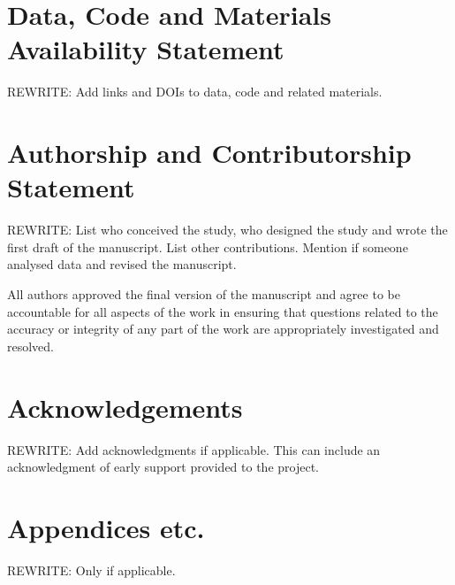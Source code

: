 \documentclass{ldr-article}
\begin{document}
\section{Data, Code and Materials Availability Statement}

\alert{REWRITE:} Add links and DOIs to data, code and related materials.

\section{Authorship and Contributorship Statement}

\alert{REWRITE:} List who conceived the study, who designed the study and wrote the first draft of the manuscript. List other contributions. Mention if someone analysed data and revised the manuscript.

All authors approved the final version of the manuscript and agree to be accountable for all aspects of the work in ensuring that questions related to the accuracy or integrity of any part of the work are appropriately investigated and resolved.

\section{Acknowledgements}

\alert{REWRITE:} Add acknowledgments if applicable. This can include an acknowledgment of early support provided to the project.

\clearpage
\appendix

\section{Appendices etc.}

\alert{REWRITE:} Only if applicable.
\end{document}
